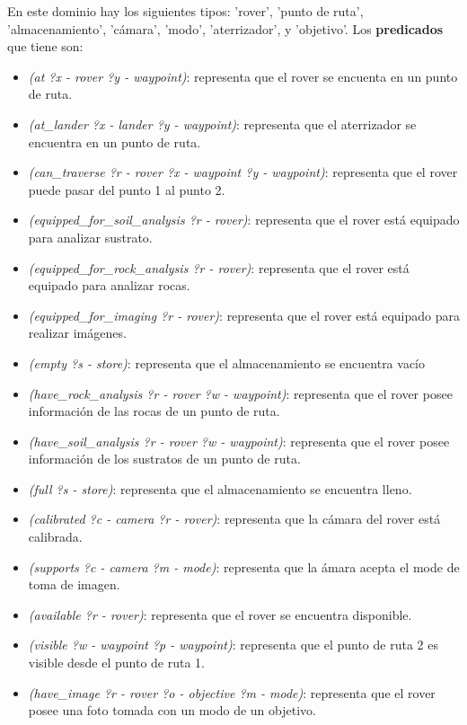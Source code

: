 \documentclass{uc3mpracticas}
\begin{document}
  En este dominio hay los siguientes tipos: 'rover', 'punto de ruta', 'almacenamiento', 'cámara', 'modo', 'aterrizador', y 'objetivo'. Los \textbf{predicados} que tiene son:
  \begin{itemize}
    \item \textit{(at ?x - rover ?y - waypoint)}: representa que el rover se encuenta en un punto de ruta.
  	\item \textit{(at\_lander ?x - lander ?y - waypoint)}: representa que el aterrizador se encuentra en un punto de ruta.
  	\item \textit{(can\_traverse ?r - rover ?x - waypoint ?y - waypoint)}: representa que el rover puede pasar del punto 1 al punto 2.
    \item \textit{(equipped\_for\_soil\_analysis ?r - rover)}: representa que el rover está equipado para analizar sustrato.
    \item \textit{(equipped\_for\_rock\_analysis ?r - rover)}: representa que el rover está equipado para analizar rocas.
    \item \textit{(equipped\_for\_imaging ?r - rover)}: representa que el rover está equipado para realizar imágenes.
    \item \textit{(empty ?s - store)}: representa que el almacenamiento se encuentra vacío
    \item \textit{(have\_rock\_analysis ?r - rover ?w - waypoint)}: representa que el rover posee información de las rocas de un punto de ruta.
    \item \textit{(have\_soil\_analysis ?r - rover ?w - waypoint)}: representa que el rover posee información de los sustratos de un punto de ruta.
    \item \textit{(full ?s - store)}: representa que el almacenamiento se encuentra lleno.
    \item \textit{(calibrated ?c - camera ?r - rover)}: representa que la cámara del rover está calibrada.
    \item \textit{(supports ?c - camera ?m - mode)}: representa que la ámara acepta el mode de toma de imagen.
    \item \textit{(available ?r - rover)}: representa que el rover se encuentra disponible.
    \item \textit{(visible ?w - waypoint ?p - waypoint)}: representa que el punto de ruta 2 es visible desde el punto de ruta 1.
    \item \textit{(have\_image ?r - rover ?o - objective ?m - mode)}: representa que el rover posee una foto tomada con un modo de un objetivo.

\end{itemize}
\end{document}
